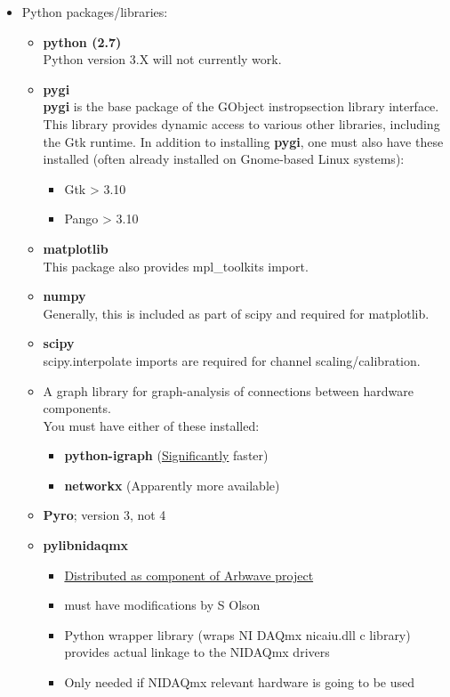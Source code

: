 \begin{itemize}
  \item Python packages/libraries:
    \begin{itemize}
      \item \textbf{python (2.7)} \\
        Python version 3.X will not currently work.
      \item \textbf{pygi} \\
        \textbf{pygi} is the base package of the GObject instropsection library
        interface.  This library provides dynamic access to various other
        libraries, including the Gtk runtime.  In addition to installing
        \textbf{pygi}, one must also have these installed (often already installed
        on Gnome-based Linux systems):
        \begin{itemize}
          \item Gtk > 3.10
          \item Pango > 3.10
        \end{itemize}

      \item \textbf{matplotlib} \\
        This package also provides mpl\_toolkits import.
      \item \textbf{numpy} \\
        Generally, this is included as part of scipy and required for matplotlib.
      \item \textbf{scipy} \\
        scipy.interpolate imports are required for channel scaling/calibration.
      \item A graph library for graph-analysis of connections between hardware
        components.\\
        You must have either of these installed:
        \begin{itemize}
          \item \textbf{python-igraph} (\underline{Significantly} faster)
          \item \textbf{networkx} (Apparently more available)
        \end{itemize}

      \item \textbf{Pyro}; version 3, not 4

      \item \textbf{pylibnidaqmx}
        \begin{itemize}
          \item \underline{Distributed as component of Arbwave project}
          \item must have modifications by S Olson
          \item Python wrapper library (wraps NI DAQmx nicaiu.dll c library)
            provides actual linkage to the NIDAQmx drivers
          \item Only needed if NIDAQmx relevant hardware is going to be used
        \end{itemize}


\end{itemize}
\end{itemize}
